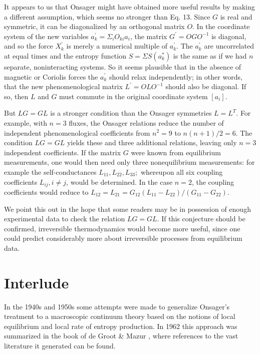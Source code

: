 \documentclass{article}
\begin{document}
It appears to us that Onsager might have obtained more useful results by making a different assumption, which seems no stronger than Eq. 13. Since $G$ is real and symmetric, it can be diagonalized by an orthogonal matrix $O$. In the coordinate system of the new variables $a_k^{\prime}=\Sigma_i O_{k i} a_i$, the matrix $G^{\prime}=O G O^{-1}$ is diagonal, and so the force $X_k^{\prime}$ is merely a numerical multiple of $a_k^{\prime}$. The $a_k^{\prime}$ are uncorrelated at equal times and the entropy function $S=\Sigma S\left(a_k^*\right)$ is the same as if we had $n$ separate, noninteracting systems. So it seems plausible that in the absence of magnetic or Coriolis forces the $a_k^{\prime}$ should relax independently; in other words, that the new phenomenological matrix $L^{\prime}=O L O^{-1}$ should also be diagonal. If so, then $L$ and $G$ must commute in the original coordinate system $\left[a_i\right]$.

But $L G=G L$ is a stronger condition than the Onsager symmetries $L=L^T$. For example, with $n=3$ fluxes, the Onsager relations reduce the number of independent phenomenological coefficients from $n^2=9$ to $n(n+1) / 2=6$. The condition $L G=G L$ yields these and three additional relations, leaving only $n=3$ independent coefficients. If the matrix $G$ were known from equilibrium measurements, one would then need only three nonequilibrium measurements: for example the self-conductances $L_{11}, L_{22}, L_{33} ;$ whereupon all six coupling coefficients $L_{i j}, i \neq j$, would be determined. In the case $n=2$, the coupling coefficients would reduce to $L_{12}=L_{21}=G_{12}\left(L_{11}-L_{22}\right) /\left(G_{11}-G_{22}\right)$.

We point this out in the hope that some readers may be in possession of enough experimental data to check the relation $L G=G L$. If this conjecture should be confirmed, irreversible thermodynamics would become more useful, since one could predict considerably more about irreversible processes from equilibrium data.

\section{Interlude}

In the 1940s and 1950s some attempts were made to generalize Onsager's treatment to a macroscopic continuum theory based on the notions of local equilibrium and local rate of entropy production. In 1962 this approach was summarized in the book of de Groot \& Mazur \cite{degroot1962}, where references to the vast literature it generated can be found.
\end{document}
